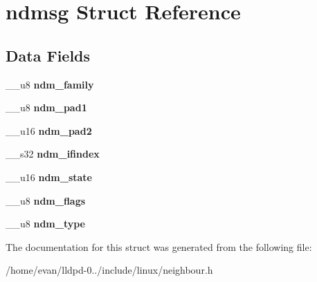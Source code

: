 \section{ndmsg \-Struct \-Reference}
\label{structndmsg}
\subsection*{\-Data \-Fields}
\begin{DoxyCompactItemize}
\item 
\-\_\-\-\_\-u8 {\bfseries ndm\-\_\-family}\label{structndmsg_aed5c1c686b683a1db95085323f5a2ba5}

\item 
\-\_\-\-\_\-u8 {\bfseries ndm\-\_\-pad1}\label{structndmsg_ae5b66d12e03b4d346849c6a5f4ab9af2}

\item 
\-\_\-\-\_\-u16 {\bfseries ndm\-\_\-pad2}\label{structndmsg_a79641a07103fa02c886865a2d96520c4}

\item 
\-\_\-\-\_\-s32 {\bfseries ndm\-\_\-ifindex}\label{structndmsg_ad7b985486efed21c88fd8aab00c44d34}

\item 
\-\_\-\-\_\-u16 {\bfseries ndm\-\_\-state}\label{structndmsg_ae3410ba4d69e05cdf7fdb6f1b740dd50}

\item 
\-\_\-\-\_\-u8 {\bfseries ndm\-\_\-flags}\label{structndmsg_a77bf2075691a25f3ccfeffe5538e9d05}

\item 
\-\_\-\-\_\-u8 {\bfseries ndm\-\_\-type}\label{structndmsg_a1a7b1b300d7370d255e5d5af4d9bb784}

\end{DoxyCompactItemize}


\-The documentation for this struct was generated from the following file\-:\begin{DoxyCompactItemize}
\item 
/home/evan/lldpd-\/0../include/linux/neighbour.\-h\end{DoxyCompactItemize}
